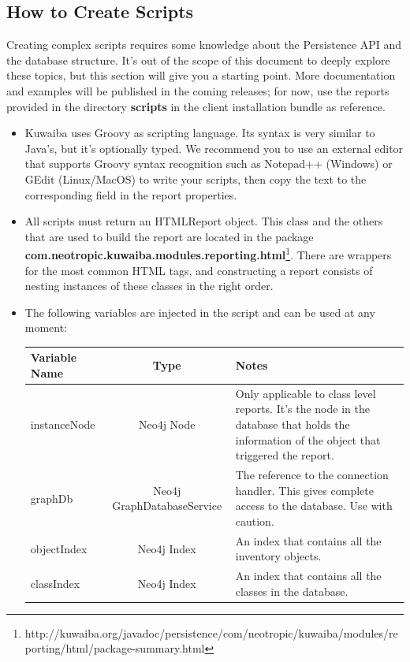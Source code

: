 \documentclass[a4paper]{article}
\begin{document}
		\subsection{How to Create Scripts}
		Creating complex scripts requires some knowledge about the Persistence API and the database structure. It's out of the scope of this document to deeply explore these topics, but this section will give you a starting point. More documentation and examples will be published in the coming releases; for now, use the reports provided in the directory \textbf{scripts} in the client installation bundle as reference.
		\begin{itemize}
			\item Kuwaiba uses Groovy as scripting language. Its syntax is very similar to Java's, but it's optionally typed. We recommend you to use an external editor that supports Groovy syntax recognition such as Notepad++ (Windows) or GEdit (Linux/MacOS) to write your scripts, then copy the text to the corresponding field in the report properties.
			\item All scripts must return an HTMLReport object. This class and the others that are used to build the report are located in the package \textbf{com.neotropic.kuwaiba.modules.reporting.html}\footnote{http://kuwaiba.org/javadoc/persistence/com/neotropic/kuwaiba/modules/reporting/html/package-summary.html}. There are wrappers for the most common HTML tags, and constructing a report consists of nesting instances of these classes in the right order.
			\item The following variables are injected in the script and can be used at any moment:
			\newpage
			\begin{table}[h!]
				\centering
				\begin{tabular}{lcp{7cm}}
					\toprule
					\textbf{Variable Name} & \textbf{Type} & \textbf{Notes} \\
					\midrule
					instanceNode & Neo4j Node & Only applicable to class level reports. It's the node in the database that holds the information of the object that triggered the report.\\
					\midrule
					graphDb & Neo4j GraphDatabaseService & The reference to the connection handler. This gives complete access to the database. Use with caution. \\
					\midrule
					objectIndex & Neo4j Index & An index that contains all the inventory objects. \\
					\midrule
					classIndex & Neo4j Index & An index that contains all the classes in the database. \\

\end{tabular}
\end{table}
\end{itemize}
\end{document}
